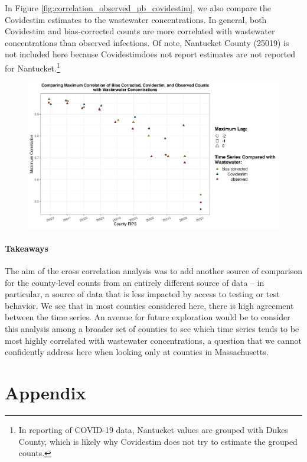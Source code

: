 \documentclass[12pt,twoside]{smiththesis}
\begin{document}
In Figure \ref{fig:correlation_observed_pb_covidestim}, we also compare the Covidestim estimates to the wastewater concentrations. In general, both Covidestim and bias-corrected counts are more correlated with wastewater concentrations than observed infections. Of note, Nantucket County (25019) is not included here because Covidestimdoes not report estimates are not reported for Nantucket.\footnote{In reporting of COVID-19 data, Nantucket values are grouped with Dukes County, which is likely why Covidestim does not try to estimate the grouped counts.}
\begin{figure}
\includegraphics[width=1\linewidth]{figure/correlation_observed_pb_covidestim} \caption{\label{fig:correlation_observed_pb_covidestim}}\label{fig:unnamed-chunk-10}
\end{figure}
\hypertarget{takeaways}{%
\subsubsection{Takeaways}\label{takeaways}}

The aim of the cross correlation analysis was to add another source of comparison for the county-level counts from an entirely different source of data -- in particular, a source of data that is less impacted by access to testing or test behavior. We see that in most counties considered here, there is high agreement between the time series. An avenue for future exploration would be to consider this analysis among a broader set of counties to see which time series tends to be most highly correlated with wastewater concentrations, a question that we cannot confidently address here when looking only at counties in Massachusetts.

\hypertarget{appendix}{%
\chapter{Appendix}\label{appendix}}
\end{document}
